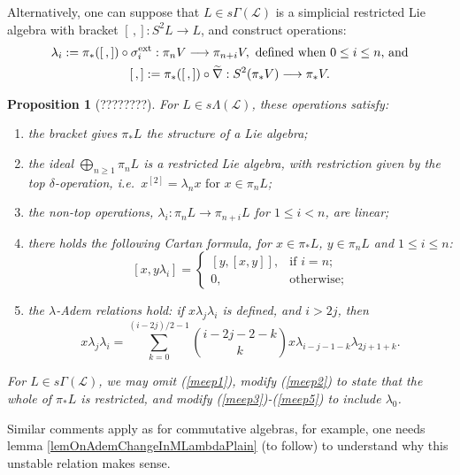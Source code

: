 \documentclass[11pt]{amsart}
\theoremstyle{plain}
\newtheorem{prop}[thm]{Proposition}
\theoremstyle{definition}
\renewcommand{\to}{\longrightarrow}
\newcommand{\scrL}{\mathscr{L}}
\theoremstyle{plain}
\newcommand{\LieOperad}{{\scrL}}
\newcommand{\restn}[1]{#1^{[2]}}
\begin{document}
\begin{Constructing (co)homotopy operations}
Alternatively, one can suppose that $L\in s \Gamma(\LieOperad)$ is a simplicial restricted Lie algebra with bracket $[\,,]:S^2L\to L$, and construct operations:
\begin{gather*}
\lambda_i:=\pi_*([\,,])\circ\sigma_i^\textup{ext}:\pi_nV\to \pi_{n+i}V,\textup{ defined when }0\leq i\leq n\textup{, and}\\
[\,,]:=\pi_*([\,,])\circ\widetilde{\nabla}:S^2(\pi_*V)\to \pi_{*}V.
\end{gather*}
\begin{prop}[????????]\label{omnibus on htpy of Lie algs}
For $L\in s\Lambda(\LieOperad)$, these operations satisfy:
\begin{enumerate}
\item \label{meep1} the bracket gives $\pi_*L$ the structure of a Lie algebra;
\item \label{meep2} the ideal $\bigoplus_{n\geq1}\pi_nL$ is a restricted Lie algebra, with restriction given by the \emph{top} $\delta$-operation, i.e.\ $\restn{x}=\lambda_nx\text{ for }x\in\pi_nL$;
\item \label{meep3} the \emph{non-top} operations, $\lambda_i:\pi_nL\to \pi_{n+i}L$ for $1\leq i<n$, are linear;
\item \label{meep4} there holds the following \emph{Cartan formula}, for $x\in \pi_*L$, $y\in \pi_nL$ and $1\leq i\leq n$:
\[[x,y\lambda_i]=\begin{cases}
[y,[x,y]],&\text{if }i=n;\\
0,&\text{otherwise};
\end{cases}
\]
\item \label{meep5} the \emph{$\lambda$-Adem relations} hold: if $x\lambda_j\lambda_i$ is defined, and $i>2j$, then
\[x\lambda_j\lambda_i=\sum_{k=0}^{(i-2j)/2-1}{i-2j-2-k\choose k}x\lambda_{i-j-1-k}\lambda_{2j+1+k}.\]
\end{enumerate}
For $L\in s\Gamma(\LieOperad)$, we may omit (\ref{meep1}), modify (\ref{meep2}) to state that the whole of $\pi_*L$ is restricted, and modify (\ref{meep3})-(\ref{meep5}) to include $\lambda_0$.
\end{prop}
Similar comments apply as for commutative algebras, for example, one needs lemma \ref{lemOnAdemChangeInMLambdaPlain} (to follow) to understand why this unstable relation makes sense. 


\end{Constructing (co)homotopy operations}
\end{document}
